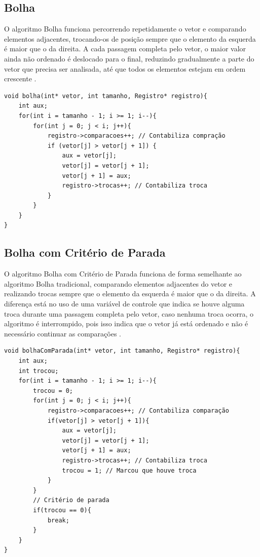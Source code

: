 \documentclass[12pt]{article}
\begin{document}
\subsection{Bolha}

O algoritmo Bolha funciona percorrendo repetidamente o vetor e comparando elementos adjacentes, trocando-os de posição sempre que o elemento da esquerda é maior que o da direita. A cada passagem completa pelo vetor, o maior valor ainda não ordenado é deslocado para o final, reduzindo gradualmente a parte do vetor que precisa ser analisada, até que todos os elementos estejam em ordem crescente \cite{cormen2009}.

\begin{lstlisting}
void bolha(int* vetor, int tamanho, Registro* registro){
    int aux;
    for(int i = tamanho - 1; i >= 1; i--){
        for(int j = 0; j < i; j++){	  
            registro->comparacoes++; // Contabiliza compração
            if (vetor[j] > vetor[j + 1]) {
                aux = vetor[j];
                vetor[j] = vetor[j + 1];
                vetor[j + 1] = aux;
                registro->trocas++; // Contabiliza troca
            }
        }
    }
}
\end{lstlisting}

\newpage

\subsection{Bolha com Critério de Parada}

O algoritmo Bolha com Critério de Parada funciona de forma semelhante ao algoritmo Bolha tradicional, comparando elementos adjacentes do vetor e realizando trocas sempre que o elemento da esquerda é maior que o da direita. A diferença está no uso de uma variável de controle que indica se houve alguma troca durante uma passagem completa pelo vetor, caso nenhuma troca ocorra, o algoritmo é interrompido, pois isso indica que o vetor já está ordenado e não é necessário continuar as comparações \cite{cormen2009}.

\begin{lstlisting}
void bolhaComParada(int* vetor, int tamanho, Registro* registro){
    int aux;
    int trocou;
    for(int i = tamanho - 1; i >= 1; i--){
        trocou = 0;
        for(int j = 0; j < i; j++){
            registro->comparacoes++; // Contabiliza comparação
            if(vetor[j] > vetor[j + 1]){
                aux = vetor[j];
                vetor[j] = vetor[j + 1];
                vetor[j + 1] = aux;
                registro->trocas++; // Contabiliza troca
                trocou = 1; // Marcou que houve troca
            }
        }
        // Critério de parada
        if(trocou == 0){
            break;
        }
    }
}
\end{lstlisting}
\end{document}
